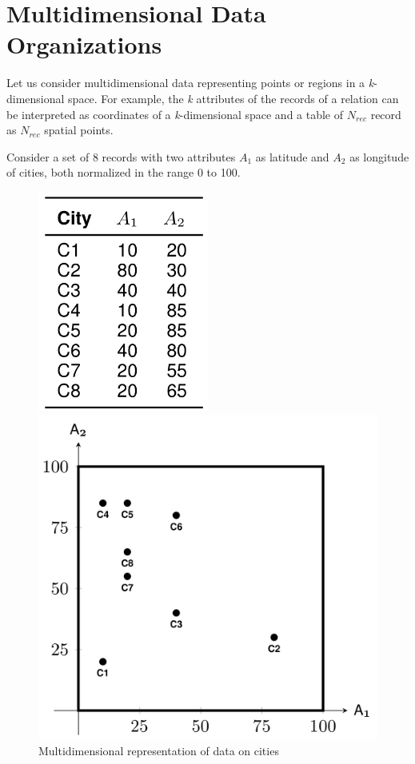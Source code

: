 \chapter{Multidimensional Data Organizations}


Let us consider multidimensional data representing points or regions in a \textit{k}-dimensional space.
For example, the \textit{k} attributes of the records of a relation can be interpreted as coordinates of a \textit{k}-dimensional space and a table of $N_{rec}$ record as $N_{rec}$ spatial points.

Consider a set of 8 records with two attributes $A_1$ as latitude and $A_2$ as longitude of cities, both normalized in the range 0 to 100.

\begin{figure}[!htb]
    \begin{minipage}{0.48\textwidth} 
     \centering
     \includegraphics[width=0.5\textwidth]{images/DBMS_Internals/MultiDimensionalDataOrganizations/mutidimdata2.jpeg}
     \caption{Multidimensional representation of data on cities}
   \end{minipage}\hfill
   \begin{minipage}{0.48\textwidth}
     \centering
     \includegraphics[width=\textwidth]{images/DBMS_Internals/MultiDimensionalDataOrganizations/multidimdata.jpeg}

\end{minipage}
\end{figure}
